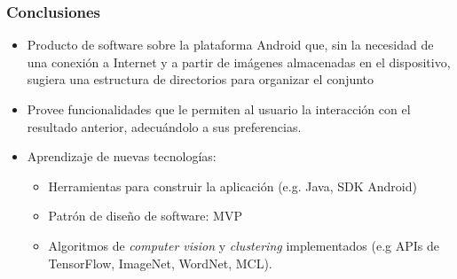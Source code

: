 \begin{frame}[t,fragile]
\frametitle {Conclusiones}

	\begin{itemize}
		\item \small{Producto de software sobre la plataforma Android que, sin la necesidad de una conexión a Internet y a partir de imágenes almacenadas en el dispositivo, sugiera una estructura de directorios para organizar el conjunto}
		\vspace{3mm}
		\item Provee funcionalidades que le permiten al usuario la interacción con el resultado anterior, adecuándolo a sus preferencias.
		\vspace{3mm}
		\item Aprendizaje de nuevas tecnologías: 
		
		\begin{itemize}
			\item Herramientas para construir la aplicación (e.g. Java, SDK Android)
			
			\item Patrón de diseño de software: MVP
			
			\item Algoritmos de \textit{computer vision} y \textit{clustering} implementados (e.g APIs de TensorFlow, ImageNet, WordNet, MCL).
		\end{itemize}
		
	\end{itemize}
\end{frame}

